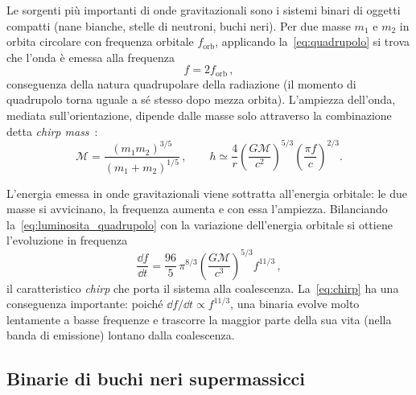 Le sorgenti più importanti di onde gravitazionali sono i sistemi binari di oggetti compatti (nane bianche, stelle di neutroni, buchi neri). Per due masse $m_1$ e $m_2$ in orbita circolare con frequenza orbitale $f_{\mathrm{orb}}$, applicando la~\eqref{eq:quadrupolo} si trova che l'onda è emessa alla frequenza
\begin{equation}
    f = 2 f_{\mathrm{orb}} \, ,
\end{equation}
conseguenza della natura quadrupolare della radiazione (il momento di quadrupolo torna uguale a sé stesso dopo mezza orbita). L'ampiezza dell'onda, mediata sull'orientazione, dipende dalle masse solo attraverso la combinazione detta \textit{chirp mass}~\cite{Maggiore2008}:
\begin{equation}
    \mathcal{M} = \frac{(m_1 m_2)^{3/5}}{(m_1+m_2)^{1/5}}\, , \qquad
    h \simeq \frac{4}{r} \left(\frac{G\mathcal{M}}{c^2}\right)^{5/3} \left(\frac{\pi f}{c}\right)^{2/3} .
    \label{eq:ampiezza_binaria}
\end{equation}

L'energia emessa in onde gravitazionali viene sottratta all'energia orbitale: le due masse si avvicinano, la frequenza aumenta e con essa l'ampiezza. Bilanciando la~\eqref{eq:luminosita_quadrupolo} con la variazione dell'energia orbitale si ottiene l'evoluzione in frequenza
\begin{equation}
    \frac{\dd f}{\dd t} = \frac{96}{5}\, \pi^{8/3} \left(\frac{G\mathcal{M}}{c^3}\right)^{5/3} f^{11/3} \, ,
    \label{eq:chirp}
\end{equation}
il caratteristico \textit{chirp} che porta il sistema alla coalescenza. La~\eqref{eq:chirp} ha una conseguenza importante: poiché $\dd f/\dd t \propto f^{11/3}$, una binaria evolve molto lentamente a basse frequenze e trascorre la maggior parte della sua vita (nella banda di emissione) lontano dalla coalescenza.

\subsection{Binarie di buchi neri supermassicci}

